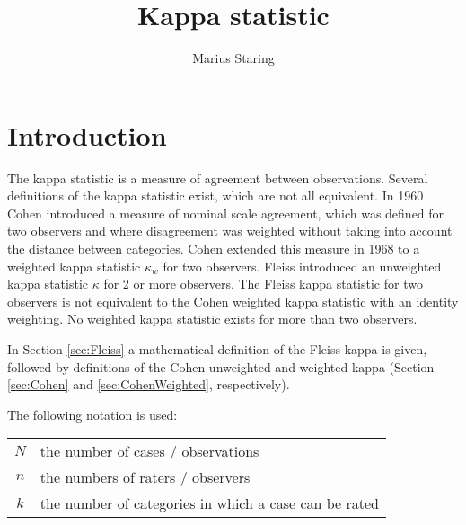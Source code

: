 \documentclass[]{article}
\begin{document}


\title{Kappa statistic}

\author{Marius Staring}
\date{}
\maketitle


\section{Introduction}

The kappa statistic is a measure of agreement between observations.
Several definitions of the kappa statistic exist, which are not all
equivalent. In 1960 Cohen \cite{Cohen60} introduced a measure of
nominal scale agreement, which was defined for two observers and
where disagreement was weighted without taking into account the
distance between categories. Cohen \cite{Cohen68} extended this
measure in 1968 to a weighted kappa statistic $\kappa_w$ for two
observers. Fleiss \cite{Fleiss71} introduced an unweighted kappa
statistic $\kappa$ for 2 or more observers. The Fleiss kappa
statistic for two observers is not equivalent to the Cohen weighted
kappa statistic with an identity weighting. No weighted kappa
statistic exists for more than two observers.

In Section \ref{sec:Fleiss} a mathematical definition of the Fleiss
kappa is given, followed by definitions of the Cohen unweighted and
weighted kappa (Section \ref{sec:Cohen} and \ref{sec:CohenWeighted},
respectively).

The following notation is used:

\begin{table}[h]
\begin{tabular}{cl}
$N$ & the number of cases / observations \\
$n$ & the numbers of raters / observers \\
$k$ & the number of categories in which a case can be rated \\
\end{tabular}
\end{table}

\end{document}
